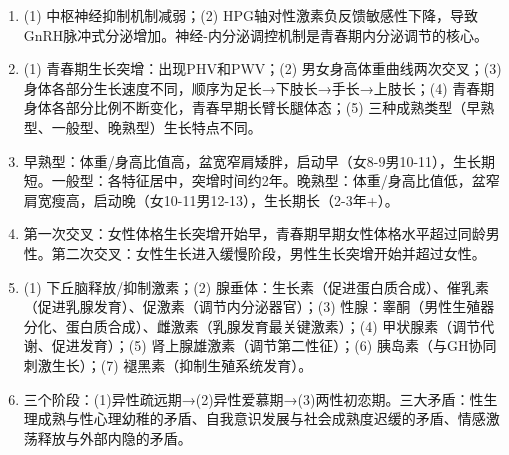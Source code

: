 {\begin{enumerate}[leftmargin=*, itemsep=5pt]
    \item (1) 中枢神经抑制机制减弱；(2) HPG轴对性激素负反馈敏感性下降，导致GnRH脉冲式分泌增加。神经-内分泌调控机制是青春期内分泌调节的核心。

    \item (1) 青春期生长突增：出现PHV和PWV；(2) 男女身高体重曲线两次交叉；(3) 身体各部分生长速度不同，顺序为足长→下肢长→手长→上肢长；(4) 青春期身体各部分比例不断变化，青春早期长臂长腿体态；(5) 三种成熟类型（早熟型、一般型、晚熟型）生长特点不同。

    \item 早熟型：体重/身高比值高，盆宽窄肩矮胖，启动早（女8-9男10-11），生长期短。一般型：各特征居中，突增时间约2年。晚熟型：体重/身高比值低，盆窄肩宽瘦高，启动晚（女10-11男12-13），生长期长（2-3年+）。

    \item 第一次交叉：女性体格生长突增开始早，青春期早期女性体格水平超过同龄男性。第二次交叉：女性生长进入缓慢阶段，男性生长突增开始并超过女性。

    \item (1) 下丘脑释放/抑制激素；(2) 腺垂体：生长素（促进蛋白质合成）、催乳素（促进乳腺发育）、促激素（调节内分泌器官）；(3) 性腺：睾酮（男性生殖器分化、蛋白质合成）、雌激素（乳腺发育最关键激素）；(4) 甲状腺素（调节代谢、促进发育）；(5) 肾上腺雄激素（调节第二性征）；(6) 胰岛素（与GH协同刺激生长）；(7) 褪黑素（抑制生殖系统发育）。

    \item 三个阶段：(1)异性疏远期→(2)异性爱慕期→(3)两性初恋期。三大矛盾：性生理成熟与性心理幼稚的矛盾、自我意识发展与社会成熟度迟缓的矛盾、情感激荡释放与外部内隐的矛盾。
\end{enumerate}
}

\newpage
